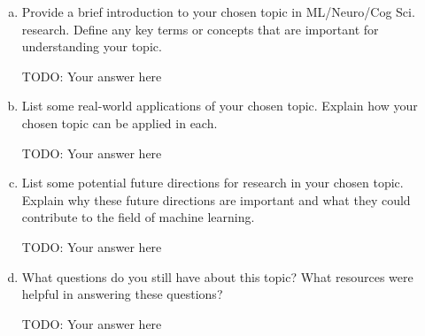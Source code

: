 \documentclass[letterpaper,11pt]{article}
\begin{document}
\begin{enumerate}[a)]
\item
    Provide a brief introduction to your chosen topic in ML/Neuro/Cog Sci. research.
    Define any key terms or concepts that are important for understanding your topic.

\begin{tcolorbox}
TODO: Your answer here
\newline
\newline
\newline
\newline
\newline
\end{tcolorbox}

\item     List some real-world applications of your chosen topic.
    Explain how your chosen topic can be applied in each.

\begin{tcolorbox}
TODO: Your answer here
\newline
\newline
\newline
\newline
\newline
\end{tcolorbox}

\item    List some potential future directions for research in your chosen topic.
    Explain why these future directions are important and what they could contribute to the field of machine learning.

\begin{tcolorbox}
TODO: Your answer here
\newline
\newline
\newline
\newline
\newline
\end{tcolorbox}

\item What questions do you still have about this topic? What resources were helpful in answering these questions?

\begin{tcolorbox}
TODO: Your answer here
\newline
\newline
\newline
\newline
\newline
\end{tcolorbox}


\end{enumerate}
\end{document}
